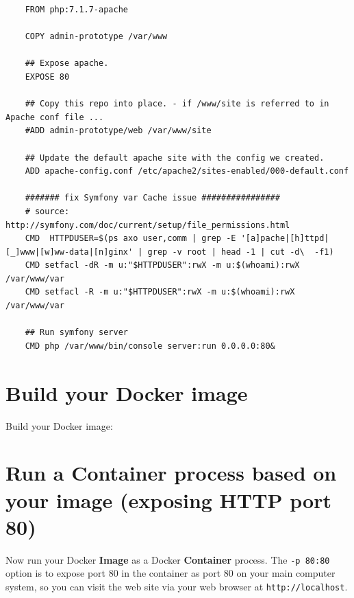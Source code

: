 \documentclass[a4paperpaper,openright]{book}
\newenvironment{Shaded}{}{}
\newcommand{\ExtensionTok}[1]{#1}
\newcommand{\NormalTok}[1]{#1}
\begin{document}
\begin{verbatim}
    FROM php:7.1.7-apache

    COPY admin-prototype /var/www

    ## Expose apache.
    EXPOSE 80

    ## Copy this repo into place. - if /www/site is referred to in Apache conf file ...
    #ADD admin-prototype/web /var/www/site

    ## Update the default apache site with the config we created.
    ADD apache-config.conf /etc/apache2/sites-enabled/000-default.conf

    ####### fix Symfony var Cache issue ################
    # source: http://symfony.com/doc/current/setup/file_permissions.html
    CMD  HTTPDUSER=$(ps axo user,comm | grep -E '[a]pache|[h]ttpd|[_]www|[w]ww-data|[n]ginx' | grep -v root | head -1 | cut -d\  -f1)
    CMD setfacl -dR -m u:"$HTTPDUSER":rwX -m u:$(whoami):rwX /var/www/var
    CMD setfacl -R -m u:"$HTTPDUSER":rwX -m u:$(whoami):rwX /var/www/var

    ## Run symfony server
    CMD php /var/www/bin/console server:run 0.0.0.0:80&
\end{verbatim}

\hypertarget{build-your-docker-image}{%
\section{Build your Docker image}\label{build-your-docker-image}}

Build your Docker image:

\begin{Shaded}
\end{Shaded}

\hypertarget{run-a-container-process-based-on-your-image-exposing-http-port-80}{%
\section{Run a Container process based on your image (exposing HTTP port
80)}\label{run-a-container-process-based-on-your-image-exposing-http-port-80}}

Now run your Docker \textbf{Image} as a Docker \textbf{Container}
process. The \texttt{-p\ 80:80} option is to expose port 80 in the
container as port 80 on your main computer system, so you can visit the
web site via your web browser at \texttt{http://localhost}.
\end{document}
